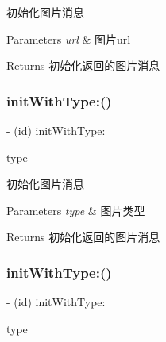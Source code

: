 初始化图片消息 
\begin{DoxyParams}{Parameters}
{\em url} & 图片url \\
\hline
\end{DoxyParams}
\begin{DoxyReturn}{Returns}
初始化返回的图片消息 
\end{DoxyReturn}
\mbox{\label{interface_tencent_image_message_obj_v1_a810169339447dcd9cb799d2baa6f6a3e}} 
\subsubsection{\texorpdfstring{init\+With\+Type\+:()}{initWithType:()}\hspace{0.1cm}{\footnotesize\ttfamily [1/2]}}
{\footnotesize\ttfamily -\/ (id) init\+With\+Type\+: \begin{DoxyParamCaption}\item[{(Tencent\+Api\+Image\+Source\+Type)}]{type }\end{DoxyParamCaption}}

初始化图片消息 
\begin{DoxyParams}{Parameters}
{\em type} & 图片类型 \\
\hline
\end{DoxyParams}
\begin{DoxyReturn}{Returns}
初始化返回的图片消息 
\end{DoxyReturn}
\mbox{\label{interface_tencent_image_message_obj_v1_a810169339447dcd9cb799d2baa6f6a3e}} 
\subsubsection{\texorpdfstring{init\+With\+Type\+:()}{initWithType:()}\hspace{0.1cm}{\footnotesize\ttfamily [2/2]}}
{\footnotesize\ttfamily -\/ (id) init\+With\+Type\+: \begin{DoxyParamCaption}\item[{(Tencent\+Api\+Image\+Source\+Type)}]{type }\end{DoxyParamCaption}}

